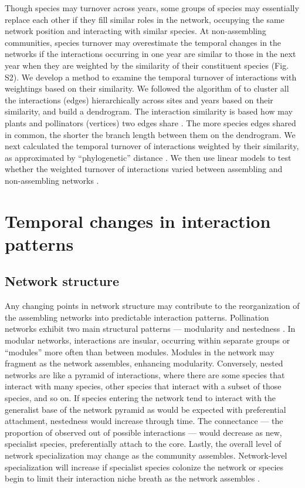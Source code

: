\documentclass[12pt]{article}
\begin{document}
Though species may turnover across years, some groups of species may
essentially replace each other if they fill similar roles in the
network, occupying the same network position and interacting with
similar species. At non-assembling communities, species turnover may
overestimate the temporal changes in the networks if the interactions
occurring in one year are similar to those in the next year when they
are weighted by the similarity of their constituent species
(Fig.~ S2). We develop a method to examine the temporal
turnover of interactions with weightings based on their similarity. We
followed the algorithm of \cite{ahn2010link} to cluster all the
interactions (edges) hierarchically across sites and years based on
their similarity, and build a dendrogram. The interaction similarity
is based how may plants and pollinators (vertices) two edges share
\citep{ahn2010link, kalinka2011linkcomm}. The more species edges
shared in common, the shorter the branch length between them on the
dendrogram.  We next calculated the temporal turnover of interactions
weighted by their similarity, as approximated by ``phylogenetic''
distance \citep{graham2008phylogenetic, picante-2010-1463}. We then
use linear models to test whether the weighted turnover of
interactions varied between assembling and non-assembling networks
\citep{lme4, lmetest}.

\section*{Temporal changes in interaction patterns}

\subsection*{Network structure}
Any changing points in network structure may contribute to the
reorganization of the assembling networks into predictable interaction
patterns. Pollination networks exhibit two main structural patterns
--- modularity \citep[e.g.,][]{Olesen2007} and nestedness
\citep[e.g.,][]{Bascompte2006, Bascompte2003}. In modular networks,
interactions are insular, occurring within separate groups or
``modules'' more often than between modules. Modules in the network
may fragment as the network assembles, enhancing
modularity. Conversely, nested networks are like a pyramid of
interactions, where there are some species that interact with many
species, other species that interact with a subset of those species,
and so on. If species entering the network tend to interact with the
generalist base of the network pyramid as would be expected with
preferential attachment, nestedness would increase through time. The
connectance --- the proportion of observed out of possible
interactions --- would decrease as new, specialist species,
preferentially attach to the core.  Lastly, the overall level of
network specialization may change as the community
assembles. Network-level specialization will increase if specialist
species colonize the network or species begin to limit their
interaction niche breath as the network assembles
\citep{bluthgen-2006-9}.
\end{document}
